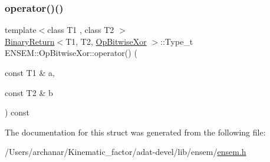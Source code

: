 \subsubsection{\texorpdfstring{operator()()}{operator()()}\hspace{0.1cm}{\footnotesize\ttfamily [3/3]}}
{\footnotesize\ttfamily template$<$class T1 , class T2 $>$ \\
\mbox{\hyperlink{structENSEM_1_1BinaryReturn}{Binary\+Return}}$<$T1, T2, \mbox{\hyperlink{structENSEM_1_1OpBitwiseXor}{Op\+Bitwise\+Xor}} $>$\+::Type\+\_\+t E\+N\+S\+E\+M\+::\+Op\+Bitwise\+Xor\+::operator() (\begin{DoxyParamCaption}\item[{const T1 \&}]{a,  }\item[{const T2 \&}]{b }\end{DoxyParamCaption}) const\hspace{0.3cm}{\ttfamily [inline]}}



The documentation for this struct was generated from the following file\+:\begin{DoxyCompactItemize}
\item 
/\+Users/archanar/\+Kinematic\+\_\+factor/adat-\/devel/lib/ensem/\mbox{\hyperlink{adat-devel_2lib_2ensem_2ensem_8h}{ensem.\+h}}\end{DoxyCompactItemize}
